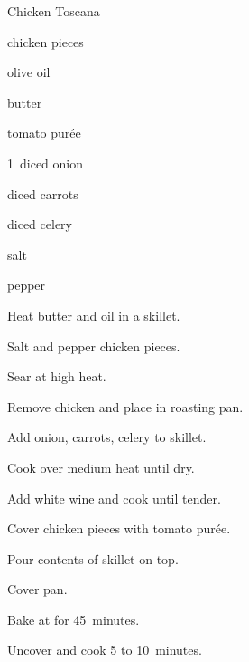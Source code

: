 \begin{recipe}{Chicken Toscana}{}{}

\begin{ingredients}
\item chicken pieces
\item olive oil
\item butter
\item tomato pur\'ee
\item 1~diced onion
\item diced carrots
\item diced celery
\item salt
\item pepper
\end{ingredients}

\begin{directions}
\item Heat butter and oil in a skillet.
\item Salt and pepper chicken pieces.
\item Sear at high heat.
\item Remove chicken and place in roasting pan.
\item Add onion, carrots, celery to skillet.
\item Cook over medium heat until dry.
\item Add white wine and cook until tender.
\item Cover chicken pieces with tomato pur\'ee.
\item Pour contents of skillet on top.
\item Cover pan.
\item Bake at  for 45~minutes.
\item Uncover and cook 5 to 10~minutes.
\end{directions}

\end{recipe}
